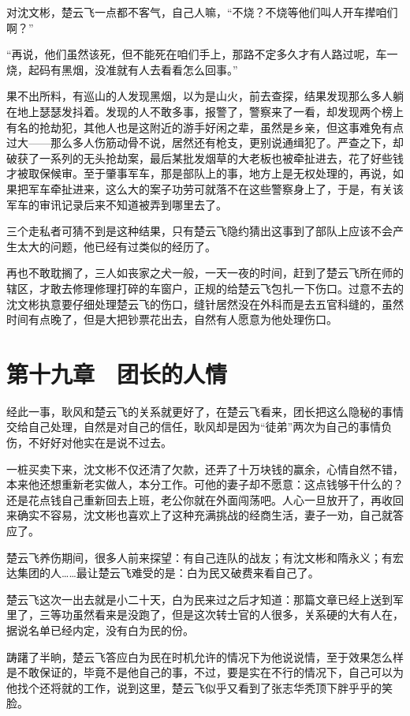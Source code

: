 对沈文彬，楚云飞一点都不客气，自己人嘛，“不烧？不烧等他们叫人开车撵咱们啊？”

“再说，他们虽然该死，但不能死在咱们手上，那路不定多久才有人路过呢，车一烧，起码有黑烟，没准就有人去看看怎么回事。”

果不出所料，有巡山的人发现黑烟，以为是山火，前去查探，结果发现那么多人躺在地上瑟瑟发抖着。发现的人不敢多事，报警了，警察来了一看，却发现两个榜上有名的抢劫犯，其他人也是这附近的游手好闲之辈，虽然是乡亲，但这事难免有点过大——那么多人伤筋动骨不说，居然还有枪支，更别说通缉犯了。严查之下，却破获了一系列的无头抢劫案，最后某批发烟草的大老板也被牵扯进去，花了好些钱才被取保候审。至于肇事军车，那是部队上的事，地方上是无权处理的，再说，如果把军车牵扯进来，这么大的案子功劳可就落不在这些警察身上了，于是，有关该军车的审讯记录后来不知道被弄到哪里去了。

三个走私者可猜不到是这种结果，只有楚云飞隐约猜出这事到了部队上应该不会产生太大的问题，他已经有过类似的经历了。

再也不敢耽搁了，三人如丧家之犬一般，一天一夜的时间，赶到了楚云飞所在师的辖区，才敢去修理修理打碎的车窗户，正规的给楚云飞包扎一下伤口。过意不去的沈文彬执意要仔细处理楚云飞的伤口，缝针居然没在外科而是去五官科缝的，虽然时间有点晚了，但是大把钞票花出去，自然有人愿意为他处理伤口。

\section{第十九章　团长的人情}

经此一事，耿风和楚云飞的关系就更好了，在楚云飞看来，团长把这么隐秘的事情交给自己处理，自然是对自己的信任，耿风却是因为“徒弟”两次为自己的事情负伤，不好好对他实在是说不过去。

一桩买卖下来，沈文彬不仅还清了欠款，还弄了十万块钱的赢余，心情自然不错，本来他还想重新老实做人，本分工作。可他的妻子却不愿意：这点钱够干什么的？还是花点钱自己重新回去上班，老公你就在外面闯荡吧。人心一旦放开了，再收回来确实不容易，沈文彬也喜欢上了这种充满挑战的经商生活，妻子一劝，自己就答应了。

楚云飞养伤期间，很多人前来探望：有自己连队的战友；有沈文彬和隋永义；有宏达集团的人……最让楚云飞难受的是：白为民又破费来看自己了。

楚云飞这次一出去就是小二十天，白为民来过之后才知道：那篇文章已经上送到军里了，三等功虽然看来是没跑了，但是这次转士官的人很多，关系硬的大有人在，据说名单已经内定，没有白为民的份。

踌躇了半晌，楚云飞答应白为民在时机允许的情况下为他说说情，至于效果怎么样是不敢保证的，毕竟不是他自己的事，不过，要是实在不行的情况下，自己可以为他找个还将就的工作，说到这里，楚云飞似乎又看到了张志华秃顶下胖乎乎的笑脸。

